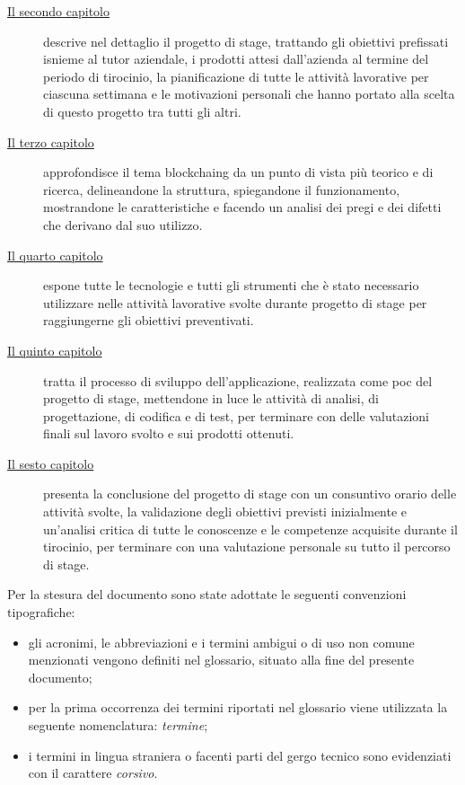 \begin{description}
    \item[{\hyperref[cap:stage]{Il secondo capitolo}}] descrive nel dettaglio il progetto di stage, trattando gli obiettivi prefissati isnieme al tutor aziendale, i prodotti attesi dall'azienda al termine del periodo di tirocinio, la pianificazione di tutte le attività lavorative per ciascuna settimana e le motivazioni personali che hanno portato alla scelta di questo progetto tra tutti gli altri.
    
    \item[{\hyperref[cap:blockchain]{Il terzo capitolo}}] approfondisce il tema \gls{blockchaing} da un punto di vista più teorico e di ricerca, delineandone la struttura, spiegandone il funzionamento, mostrandone le caratteristiche e facendo un analisi dei pregi e dei difetti che derivano dal suo utilizzo.
    
    \item[{\hyperref[cap:tecnologie-strumenti]{Il quarto capitolo}}] espone tutte le tecnologie e tutti gli strumenti che è stato necessario utilizzare nelle attività lavorative svolte durante progetto di stage per raggiungerne gli obiettivi preventivati.
    
    \item[{\hyperref[cap:applicazione]{Il quinto capitolo}}] tratta il processo di sviluppo dell'applicazione, realizzata come \gls{poc} del progetto di stage, mettendone in luce le attività di analisi, di progettazione, di codifica e di test, per terminare con delle valutazioni finali sul lavoro svolto e sui prodotti ottenuti.
    
    \item[{\hyperref[cap:conclusioni]{Il sesto capitolo}}] presenta la conclusione del progetto di stage con un consuntivo orario delle attività svolte, la validazione degli obiettivi previsti inizialmente e un'analisi critica di tutte le conoscenze e le competenze acquisite durante il tirocinio, per terminare con una valutazione personale su tutto il percorso di stage.
\end{description}

Per la stesura del documento sono state adottate le seguenti convenzioni tipografiche:

\begin{itemize}
	\item gli acronimi, le abbreviazioni e i termini ambigui o di uso non comune menzionati vengono definiti nel glossario, situato alla fine del presente documento;
	\item per la prima occorrenza dei termini riportati nel glossario viene utilizzata la seguente nomenclatura: \emph{termine}\glsfirstoccur;
	\item i termini in lingua straniera o facenti parti del gergo tecnico sono evidenziati con il carattere \emph{corsivo}.
\end{itemize}
